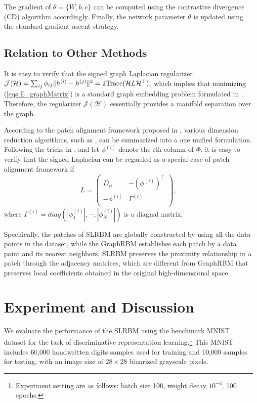 \documentclass[a4paper,10pt,twocolumn]{article}
\begin{document}
The gradient of $\theta=\{W, b, c\}$ can  be computed using the contrastive divergence (CD) \cite{hinton2002training} algorithm accordingly. Finally, the network parameter $\theta$ is updated using the standard gradient ascent strategy.

\subsection{Relation to Other Methods}
It is easy to verify that the signed graph Laplacian regularizer  $\mathcal{J}(\mathcal{H})=\sum_{ij}\phi_{ij}\|h^{(i)} - h^{(j)}\|^2 = 2\emph{\emph{Trace}}(\mathcal{H}L\mathcal{H}^{\top})$, which implies that minimizing (\ref{eqs:E_graphMatrix}) is a standard graph embedding problem formulated in  \cite{yan2007graph}. Therefore, the regularizer $\mathcal{J}(\mathcal{H})$ essentially provides a manifold separation over the graph.


According to the patch alignment framework proposed in \cite{zhang2009patch}, various dimension reduction algorithms, such as \cite{roweis2000nonlinear,jolliffe1986principal}, can be summarized into a one unified formulation. Following the tricks in \cite{kunegis2010spectral,zhang2009patch}, and let $\phi^{(i)}$ denote the $i$th column of $\Phi$, it is easy to verify that the signed Laplacian can be regarded as a special case of patch alignment framework if
\begin{equation}
    L = \left(
  \begin{array}{cc}
    D_{ii} & -(\phi^{(i)})^{\top}\\
    -\phi^{(i)}& \Gamma^{(i)}\\
  \end{array}
\right),
\end{equation}
where $\Gamma^{(i)} = diag(|\phi^{(i)}_1|, \cdots, |\phi^{(i)}_N|)$ is a diagnal matrix.

Specifically, the patches of  SLRBM are globally constructed by using all the data points in the dataset, while the GraphRBM establishes each patch by a  data point and its nearest neighbors. SLRBM preserves the proximity relationship in a patch through the adjacency matrices, which are different from GraphRBM that preserves local coefficients obtained in the original high-dimensional space.

\section{Experiment and Discussion}
We evaluate the performance of the SLRBM using the benchmark MNIST dataset \cite{lecun1998gradient} for the task of discriminative representation learning.\footnote{Experiment setting are as follows: batch size 100, weight decay $10^{-4}$, 100 epochs.} This MNIST includes 60,000 handwritten digits samples used for training and 10,000 samples for testing, with an image size of $28\times28$ binarized grayscale pixels.
\end{document}
